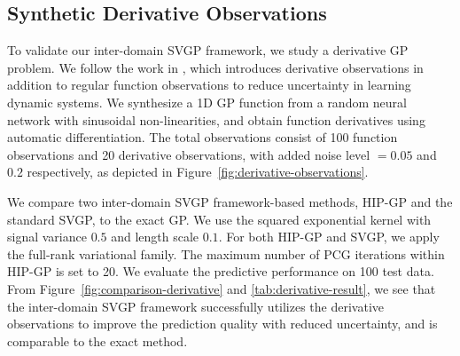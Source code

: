 \subsection{Synthetic Derivative Observations}
\label{sec:derivative}
To validate our inter-domain SVGP framework, we study a derivative GP problem.
We follow the work in \citet{solak2003derivative}, which introduces derivative observations
in addition to regular function observations to reduce
uncertainty in learning dynamic systems.
We synthesize a 1D GP function from a random neural network with
sinusoidal non-linearities, and
obtain function derivatives using automatic differentiation.
The total observations consist of 100 function observations
and 20 derivative observations,
with added noise level $=0.05$ and $0.2$ respectively,
as depicted in Figure~\ref{fig:derivative-observations}.

We compare two inter-domain SVGP framework-based methods, HIP-GP and the standard SVGP,
to the exact GP. We use the squared exponential kernel
with signal variance $0.5$ and length scale $0.1$. For both HIP-GP and SVGP,
we apply the full-rank variational family.
The maximum number of PCG iterations within HIP-GP is set to 20.
We evaluate the predictive performance on 100 test data.
From Figure~\ref{fig:comparison-derivative} and \ref{tab:derivative-result},
we see that the inter-domain SVGP framework successfully utilizes
the derivative observations to improve the prediction quality with reduced uncertainty,
and is comparable to the exact method.


